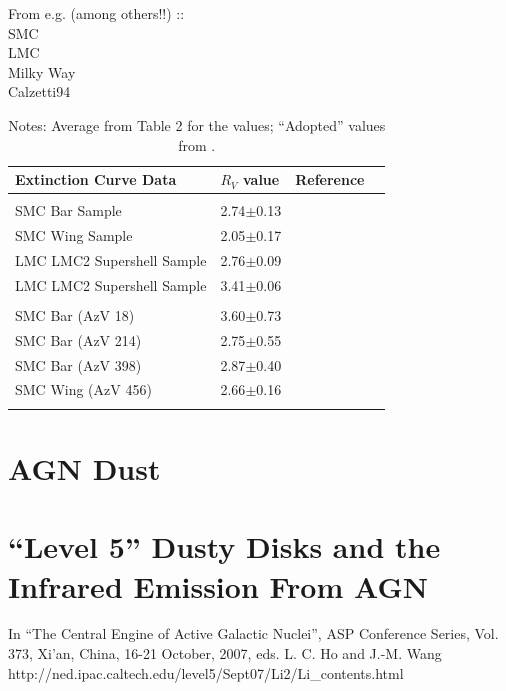 \documentclass[11pt]{article}
\begin{document}
From e.g. (among others!!) \citet{Gordon03, Glikman12}::\\
SMC\\
LMC\\
Milky Way\\
Calzetti94\\

\begin{table}[h]
  \begin{center}
    \begin{tabular}{llcl}
      \hline
      \hline
      Extinction Curve Data                 & $R_{V}$ value & Reference \\
      \hline
      & & & \\
      SMC Bar Sample                       & 2.74$\pm$0.13  & \citet{Gordon03}\\
      SMC Wing Sample                    & 2.05$\pm$0.17  & \citet{Gordon03}\\
      LMC LMC2 Supershell Sample  & 2.76$\pm$0.09  & \citet{Gordon03}\\
      LMC LMC2 Supershell Sample  & 3.41$\pm$0.06  & \citet{Gordon03}\\
      & & & \\
      SMC Bar (AzV 18)                      & 3.60$\pm$0.73  & \citet{Gordon98}\\
      SMC Bar (AzV 214)                    & 2.75$\pm$0.55  & \citet{Gordon98}\\
      SMC Bar (AzV 398)                    & 2.87$\pm$0.40  & \citet{Gordon98}\\
      SMC Wing (AzV 456)                 & 2.66$\pm$0.16  & \citet{Gordon98}\\
      & & & \\
      \hline
      \hline
    \end{tabular}
    \caption{Notes: Average from Table 2 for the \citet{Gordon03} values; 
``Adopted'' values from \citet{Gordon98}.}
\end{center}
\end{table}






\section{AGN Dust}

\section{``Level 5'' Dusty Disks and the Infrared Emission From AGN}
In ``The Central Engine of Active Galactic Nuclei'', ASP Conference Series, Vol. 373, Xi'an, China, 16-21 October, 2007, eds. L. C. Ho and J.-M. Wang 
http://ned.ipac.caltech.edu/level5/Sept07/Li2/Li\_contents.html
\end{document}
